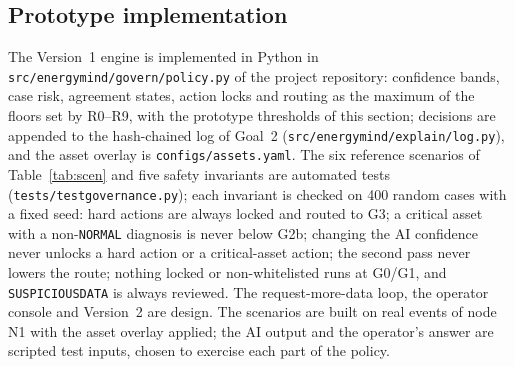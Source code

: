 \documentclass[11pt,a4paper]{article}
\renewcommand{\_}{\textunderscore\allowbreak}
\providecommand{\SD}{\texttt{SUSPICIOUS\_DATA}}
\providecommand{\NORM}{\texttt{NORMAL}}
\newcommand{\lvl}[1]{\textsf{#1}}
\begin{document}
\subsection{Prototype implementation}
The Version~1 engine is implemented in Python in \texttt{src/energymind/govern/policy.py} of the project
repository: confidence bands, case risk, agreement states, action locks and routing as the maximum of the
floors set by R0--R9, with the prototype thresholds of this section; decisions are appended to the hash-chained
log of Goal~2 (\texttt{src/energymind/explain/log.py}), and the asset overlay is \texttt{configs/assets.yaml}.
The six reference scenarios of Table~\ref{tab:scen} and five safety invariants are automated tests
(\texttt{tests/test\_governance.py}); each invariant is checked on 400 random cases with a fixed seed: hard
actions are always locked and routed to \lvl{G3}; a critical asset with a non-\NORM{} diagnosis is never below
\lvl{G2b}; changing the AI confidence never unlocks a hard action or a critical-asset action; the second pass
never lowers the route; nothing locked or non-whitelisted runs at \lvl{G0}/\lvl{G1}, and \SD{} is always
reviewed. The request-more-data loop, the operator console and Version~2 are design. The scenarios are built on
real events of node N1 with the asset overlay applied; the AI output and the operator's answer are scripted test
inputs, chosen to exercise each part of the policy.
\end{document}
